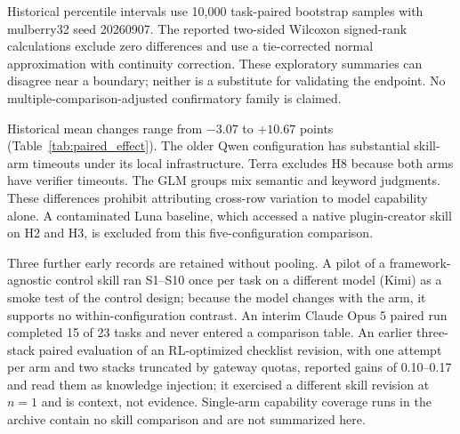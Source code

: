 \documentclass[11pt]{article}
\begin{document}
Historical percentile intervals use 10,000 task-paired bootstrap samples with mulberry32 seed 20260907. The reported two-sided Wilcoxon signed-rank calculations exclude zero differences and use a tie-corrected normal approximation with continuity correction. These exploratory summaries can disagree near a boundary; neither is a substitute for validating the endpoint. No multiple-comparison-adjusted confirmatory family is claimed.


Historical mean changes range from $-3.07$ to $+10.67$ points (Table~\ref{tab:paired_effect}). The older Qwen configuration has substantial skill-arm timeouts under its local infrastructure. Terra excludes H8 because both arms have verifier timeouts. The GLM groups mix semantic and keyword judgments. These differences prohibit attributing cross-row variation to model capability alone. A contaminated Luna baseline, which accessed a native plugin-creator skill on H2 and H3, is excluded from this five-configuration comparison.

Three further early records are retained without pooling. A pilot of a framework-agnostic control skill ran S1--S10 once per task on a different model (Kimi) as a smoke test of the control design; because the model changes with the arm, it supports no within-configuration contrast. An interim Claude Opus 5 paired run completed 15 of 23 tasks and never entered a comparison table. An earlier three-stack paired evaluation of an RL-optimized checklist revision, with one attempt per arm and two stacks truncated by gateway quotas, reported gains of 0.10--0.17 and read them as knowledge injection; it exercised a different skill revision at $n{=}1$ and is context, not evidence. Single-arm capability coverage runs in the archive contain no skill comparison and are not summarized here.
\end{document}
